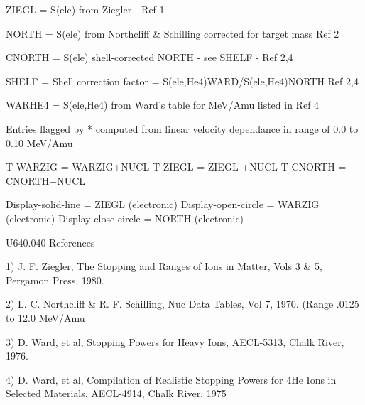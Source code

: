    ZIEGL  = S(ele) from Ziegler - Ref 1
 
   NORTH  = S(ele) from Northcliff & Schilling corrected for target mass
            Ref 2
 
   CNORTH = S(ele) shell-corrected NORTH - see SHELF - Ref 2,4
 
   SHELF  = Shell correction factor = S(ele,He4)WARD/S(ele,He4)NORTH
            Ref 2,4
 
   WARHE4 = S(ele,He4) from Ward's table for MeV/Amu listed in Ref 4
 
   Entries flagged by * computed from linear velocity dependance in
   range of 0.0 to 0.10 MeV/Amu
 
 
   T-WARZIG = WARZIG+NUCL
   T-ZIEGL  = ZIEGL +NUCL
   T-CNORTH = CNORTH+NUCL
 
   Display-solid-line   = ZIEGL  (electronic)
   Display-open-circle  = WARZIG (electronic)
   Display-close-circle = NORTH  (electronic)
 
 
   U640.040  References
 
   1)  J. F. Ziegler, The Stopping and Ranges of Ions in Matter, Vols 3 & 5,
       Pergamon Press, 1980.
 
   2)  L. C. Northcliff & R. F. Schilling, Nuc Data Tables, Vol 7, 1970.
       (Range .0125 to 12.0 MeV/Amu
 
   3)  D. Ward, et al, Stopping Powers for Heavy Ions, AECL-5313,
       Chalk River, 1976.
 
   4)  D. Ward, et al, Compilation of Realistic Stopping Powers for 4He Ions
       in Selected Materials, AECL-4914, Chalk River, 1975
